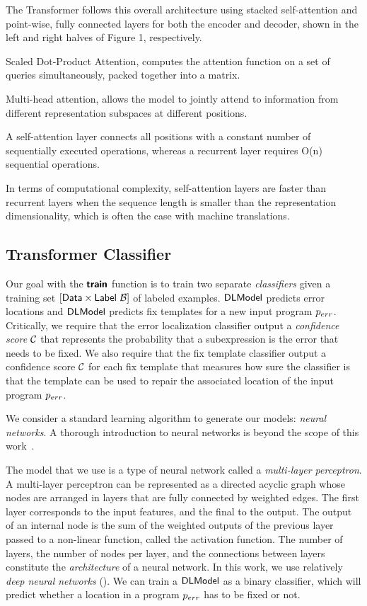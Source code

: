 The Transformer follows this overall architecture using stacked self-attention
and point-wise, fully connected layers for both the encoder and decoder, shown
in the left and right halves of Figure 1, respectively.

Scaled Dot-Product Attention, computes the attention function on a set of
queries simultaneously, packed together into a matrix.

Multi-head attention, allows the model to jointly attend to information from
different representation subspaces at different positions.

A self-attention layer connects all positions with a constant number of
sequentially executed operations, whereas a recurrent layer requires O(n)
sequential operations.

In terms of computational complexity, self-attention layers are faster than
recurrent layers when the sequence length is smaller than the representation
dimensionality, which is often the case with machine translations.

\subsection{Transformer Classifier}
\label{sec:seq-classifiers:location-rank}

Our goal with the $\bm{\mathsf{train}}$ function is to train two separate
\emph{classifiers} given a training set $[\mathsf{Data} \times
\mathsf{Label}\ \mathcal{B}]$ of labeled examples. $\mathsf{DLModel}$ predicts error locations and
$\mathsf{DLModel}$ predicts fix templates for a new input program $p_{err}$. Critically, we
require that the error localization classifier output a \emph{confidence score}
$\mathcal{C}$ that represents the probability that a subexpression is the error that
needs to be fixed. We also require that the fix template classifier output a
confidence score $\mathcal{C}$ for each fix template that measures
how sure the classifier is that the template can be used to repair the
associated location of the input program $p_{err}$.

We consider a standard learning algorithm to generate our models: \emph{neural
networks}. A thorough introduction to neural networks is
beyond the scope of this work~\citep{Hastie2009-bn,Nielsen2015-pu}.

The model that we use is a type of neural network called a \emph{multi-layer
perceptron}. A multi-layer perceptron can be represented as a directed acyclic
graph whose nodes are arranged in layers that are fully connected by weighted
edges. The first layer corresponds to the input features, and the final to the
output. The output of an internal node is the sum of the weighted
outputs of the previous layer passed to a non-linear function, called the
activation function. The number of layers,
the number of nodes per layer, and the connections between layers constitute the
\emph{architecture} of a neural network. In this work, we use relatively
\emph{deep neural networks} (\dnn). We can train a \dnn $\mathsf{DLModel}$ as a
binary classifier, which will predict whether a location in a program $p_{err}$
has to be fixed or not.

